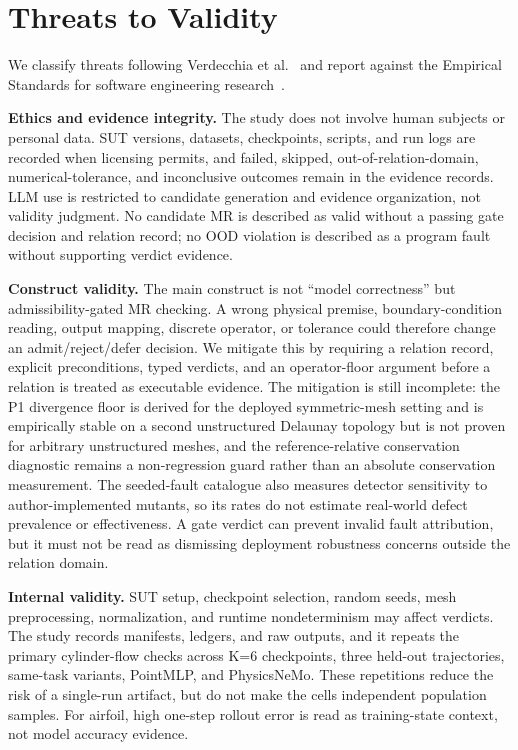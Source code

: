 \documentclass[preprint,12pt,authoryear]{elsarticle}
\begin{document}
\section{Threats to Validity}
\label{sec:threats}

We classify threats following Verdecchia et al.~\citep{verdecchia2023threats} and report against the Empirical Standards for software engineering research~\citep{ralph2021empirical}.

\textbf{Ethics and evidence integrity.} The study does not involve human subjects or personal data. SUT versions, datasets, checkpoints, scripts, and run logs are recorded when licensing permits, and failed, skipped, out-of-relation-domain, numerical-tolerance, and inconclusive outcomes remain in the evidence records. LLM use is restricted to candidate generation and evidence organization, not validity judgment. No candidate MR is described as valid without a passing gate decision and relation record; no OOD violation is described as a program fault without supporting verdict evidence.

\textbf{Construct validity.} The main construct is not ``model correctness'' but admissibility-gated MR checking. A wrong physical premise, boundary-condition reading, output mapping, discrete operator, or tolerance could therefore change an admit/reject/defer decision. We mitigate this by requiring a relation record, explicit preconditions, typed verdicts, and an operator-floor argument before a relation is treated as executable evidence. The mitigation is still incomplete: the P1 divergence floor is derived for the deployed symmetric-mesh setting and is empirically stable on a second unstructured Delaunay topology but is not proven for arbitrary unstructured meshes, and the reference-relative conservation diagnostic remains a non-regression guard rather than an absolute conservation measurement. The seeded-fault catalogue also measures detector sensitivity to author-implemented mutants, so its rates do not estimate real-world defect prevalence or effectiveness. A gate verdict can prevent invalid fault attribution, but it must not be read as dismissing deployment robustness concerns outside the relation domain.

\textbf{Internal validity.} SUT setup, checkpoint selection, random seeds, mesh preprocessing, normalization, and runtime nondeterminism may affect verdicts. The study records manifests, ledgers, and raw outputs, and it repeats the primary cylinder-flow checks across K=6 checkpoints, three held-out trajectories, same-task variants, PointMLP, and PhysicsNeMo. These repetitions reduce the risk of a single-run artifact, but do not make the cells independent population samples. For airfoil, high one-step rollout error is read as training-state context, not model accuracy evidence.
\end{document}

